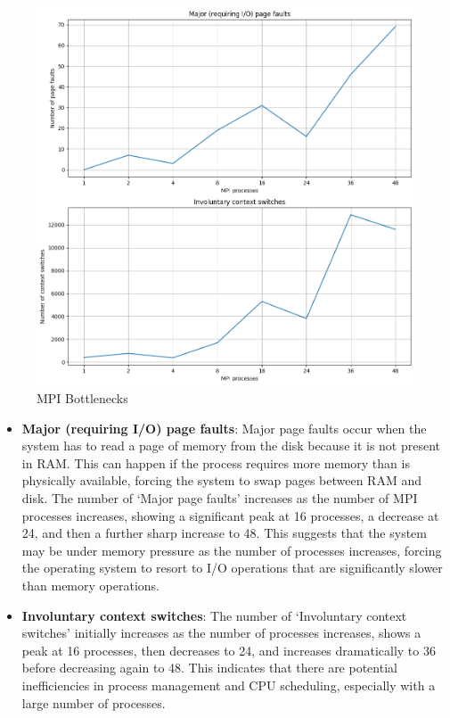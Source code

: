 \documentclass[
]{article}
\begin{document}
\begin{figure}
\centering
\includegraphics{figures/bott_mpi.png}
\caption{MPI Bottlenecks}
\end{figure}

\begin{itemize}
\item
  \textbf{Major (requiring I/O) page faults}: Major page faults occur
  when the system has to read a page of memory from the disk because it
  is not present in RAM. This can happen if the process requires more
  memory than is physically available, forcing the system to swap pages
  between RAM and disk. The number of `Major page faults' increases as
  the number of MPI processes increases, showing a significant peak at
  16 processes, a decrease at 24, and then a further sharp increase to
  48. This suggests that the system may be under memory pressure as the
  number of processes increases, forcing the operating system to resort
  to I/O operations that are significantly slower than memory
  operations.
\item
  \textbf{Involuntary context switches}: The number of `Involuntary
  context switches' initially increases as the number of processes
  increases, shows a peak at 16 processes, then decreases to 24, and
  increases dramatically to 36 before decreasing again to 48. This
  indicates that there are potential inefficiencies in process
  management and CPU scheduling, especially with a large number of
  processes.
\end{itemize}
\end{document}
